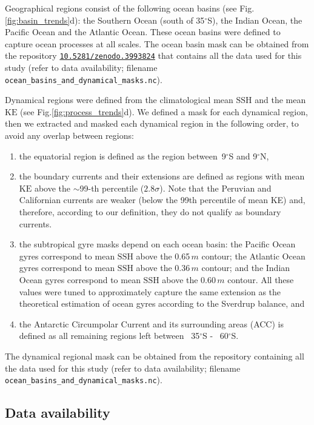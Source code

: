 \documentclass{nature}
\newcommand{\KE}{\text{KE}}
\newcommand{\SSH}{\text{SSH}}
\begin{document}
Geographical regions consist of the following ocean basins (see Fig.\ref{fig:basin_trends}d): the Southern Ocean (south of 35$^\circ$S), the Indian Ocean, the Pacific Ocean and the Atlantic Ocean. These ocean basins were deﬁned to capture ocean processes at all scales. The ocean basin mask can be obtained from the repository \texttt{\href{https://doi.org/10.5281/zenodo.3993824}{10.5281/zenodo.3993824}} that contains all the data used for this study (refer to data availability; filename \texttt{ocean\_basins\_and\_dynamical\_masks.nc}).

Dynamical regions were defined from the climatological mean $\SSH$ and the mean $\KE$ (see Fig.\ref{fig:process_trends}d). We defined a mask for each dynamical region, then we extracted and masked each dynamical region in the following order, to avoid any overlap between regions:
\begin{enumerate}
	\item the equatorial region is defined as the region between~9$^\circ$S and 9$^\circ$N,
	\item the boundary currents and their extensions are defined as regions with mean $\KE$ above the $\sim$99-th percentile ($2.8\sigma$). Note that the Peruvian and Californian currents are weaker (below the 99th percentile of mean KE) and, therefore, according to our definition, they do not qualify as boundary currents.
	\item the subtropical gyre masks depend on each ocean basin: the Pacific Ocean gyres correspond to mean $\SSH$ above the 0.65$\,m$ contour; the Atlantic Ocean gyres correspond to mean $\SSH$ above the 0.36$\,m$ contour; and the Indian Ocean gyres correspond to mean $\SSH$ above the 0.60$\,m$ contour. All these values were tuned to approximately capture the same extension as the theoretical estimation of ocean gyres according to the Sverdrup balance, and 
	\item the Antarctic Circumpolar Current and its surrounding areas (ACC) is defined as all remaining regions left between ~35$^\circ$S - ~60$^\circ$S.
\end{enumerate}
The dynamical regional mask can be obtained from the repository containing all the data used for this study (refer to data availability; filename \texttt{ocean\_basins\_and\_dynamical\_masks.nc}).

\subsection{Data availability}\mbox{}\vspace{-1.5em}
\end{document}
